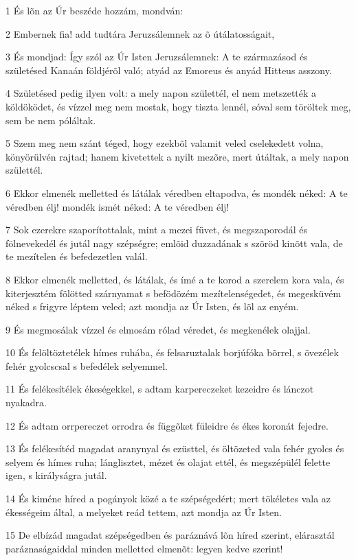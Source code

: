 \par 1 És lõn az Úr beszéde hozzám, mondván:
\par 2 Embernek fia! add tudtára Jeruzsálemnek az õ útálatosságait,
\par 3 És mondjad: Így szól az Úr Isten Jeruzsálemnek: A te származásod és születésed Kanaán földjérõl való; atyád az Emoreus és anyád Hitteus asszony.
\par 4 Születésed pedig ilyen volt: a mely napon születtél, el nem metszették a köldöködet, és vízzel meg nem mostak, hogy tiszta lennél, sóval sem töröltek meg, sem be nem póláltak.
\par 5 Szem meg nem szánt téged, hogy ezekbõl valamit veled cselekedett volna, könyörülvén rajtad; hanem kivetettek a nyilt mezõre, mert útáltak, a mely napon születtél.
\par 6 Ekkor elmenék melletted és látálak véredben eltapodva, és mondék néked: A te véredben élj! mondék ismét néked: A te véredben élj!
\par 7 Sok ezerekre szaporítottalak, mint a mezei füvet, és megszaporodál és fölnevekedél és jutál nagy szépségre; emlõid duzzadának s szõröd kinõtt vala, de te mezítelen és befedezetlen valál.
\par 8 Ekkor elmenék melletted, és látálak, és ímé a te korod a szerelem kora vala, és kiterjesztém fölötted szárnyamat s befödözém mezítelenségedet, és megesküvém néked  s frigyre léptem veled; azt mondja az Úr Isten, és lõl az enyém.
\par 9 És megmosálak vízzel és elmosám rólad véredet, és megkenélek olajjal.
\par 10 És felöltöztetélek hímes ruhába, és felsaruztalak borjúfóka bõrrel, s övezélek fehér gyolcscsal s befedélek selyemmel.
\par 11 És felékesítélek ékeségekkel, s adtam karpereczeket kezeidre és lánczot nyakadra.
\par 12 És adtam orrpereczet orrodra és függõket füleidre és ékes koronát fejedre.
\par 13 És felékesítéd magadat aranynyal és ezüsttel, és öltözeted vala fehér gyolcs és selyem és hímes ruha; lánglisztet, mézet és olajat ettél, és megszépülél felette igen, s királyságra jutál.
\par 14 És kiméne híred a pogányok közé a te szépségedért; mert tökéletes vala az ékességeim által, a melyeket reád tettem, azt mondja az Úr Isten.
\par 15 De elbízád magadat szépségedben és paráznává lõn híred szerint, elárasztál paráznaságaiddal minden melletted elmenõt:  legyen kedve szerint!
